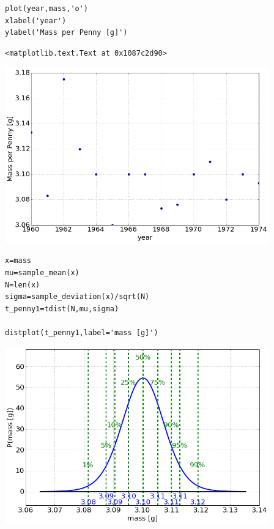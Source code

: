 \begin{lstlisting}
plot(year,mass,'o')
xlabel('year')
ylabel('Mass per Penny [g]')
\end{lstlisting}

\begin{verbatim}
<matplotlib.text.Text at 0x1087c2d90>
\end{verbatim}

\begin{center}\includegraphics[width=4.5in]{Applications_of_Parameter_Estimation/Applications_of_Parameter_Estimation_fig4.png}\end{center}

\begin{lstlisting}
x=mass
mu=sample_mean(x)
N=len(x)
sigma=sample_deviation(x)/sqrt(N)
t_penny1=tdist(N,mu,sigma)

distplot(t_penny1,label='mass [g]')
\end{lstlisting}

\begin{center}\includegraphics[width=4.5in]{Applications_of_Parameter_Estimation/Applications_of_Parameter_Estimation_fig5.png}\end{center}


